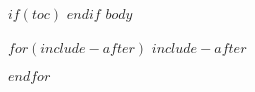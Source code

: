 \documentclass[a4paper]{report}
\begin{document}
\begin{titlepage}



\end{titlepage}



$if(toc)$
{
\hypersetup{linkcolor=black}
\setcounter{tocdepth}{$toc-depth$}
\tableofcontents
}
$endif$
$body$

\appendix


\printbibliography

$for(include-after)$
$include-after$

$endfor$
\end{document}
